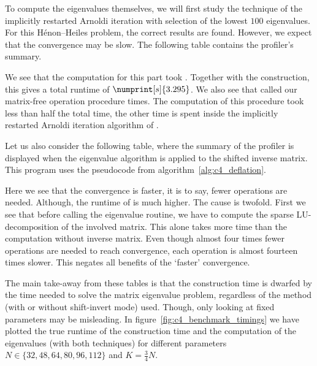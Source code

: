 To compute the eigenvalues themselves, we will first study the technique of the implicitly restarted Arnoldi iteration with selection of the lowest $100$ eigenvalues. For this Hénon--Heiles problem, the correct results are found. However, we expect that the convergence may be slow. The following table contains the profiler's summary.
\begin{center}
    
\end{center}
We see that the computation for this part took . Together with the construction, this gives a total runtime of $\numprint[s]{3.295}$. We also see that \spectra{} called our matrix-free operation procedure  times. The computation of this procedure took less than half the total time, the other time is spent inside the implicitly restarted Arnoldi iteration algorithm of \spectra{}.

Let us also consider the following table, where the summary of the profiler is displayed when the eigenvalue algorithm is applied to the shifted inverse matrix. This program uses the pseudocode from algorithm~\ref{alg:c4_deflation}.
\begin{center}
    
\end{center}
Here we see that the convergence is faster, it is to say, fewer operations are needed. Although, the runtime of  is much higher. The cause is twofold. First we see that before calling the eigenvalue routine, we have to compute the sparse LU-decomposition of the involved matrix. This alone takes more time than the computation without inverse matrix. Even though almost four times fewer operations are needed to reach convergence, each operation is almost fourteen times slower. This negates all benefits of the `faster' convergence.

The main take-away from these tables is that the construction time is dwarfed by the time needed to solve the matrix eigenvalue problem, regardless of the method (with or without shift-invert mode) used. Though, only looking at fixed parameters may be misleading. In figure~\ref{fig:c4_benchmark_timings} we have plotted the true runtime of the construction time and the computation of the eigenvalues (with both techniques) for different parameters $N \in \{32,48,64,80,96,112\}$ and $K = \frac{3}{4}N$.

